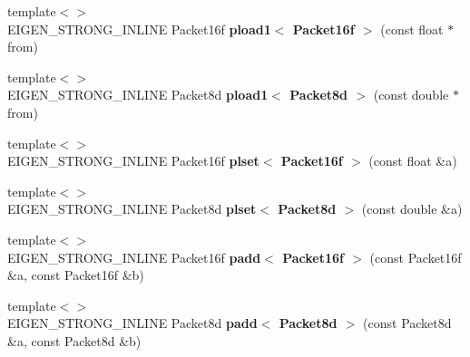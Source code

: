 \begin{DoxyCompactItemize}
\item 
\mbox{\label{namespace_eigen_1_1internal_a93170893c443fea5002051e343f9ffa9}} 
{\footnotesize template$<$$>$ }\\E\+I\+G\+E\+N\+\_\+\+S\+T\+R\+O\+N\+G\+\_\+\+I\+N\+L\+I\+NE Packet16f {\bfseries pload1$<$ Packet16f $>$} (const float $\ast$from)
\item 
\mbox{\label{namespace_eigen_1_1internal_a6dc41c241621125059e06cbb17b2b5b0}} 
{\footnotesize template$<$$>$ }\\E\+I\+G\+E\+N\+\_\+\+S\+T\+R\+O\+N\+G\+\_\+\+I\+N\+L\+I\+NE Packet8d {\bfseries pload1$<$ Packet8d $>$} (const double $\ast$from)
\item 
\mbox{\label{namespace_eigen_1_1internal_a584837fcbeb0a3a2f270d0e5641dd549}} 
{\footnotesize template$<$$>$ }\\E\+I\+G\+E\+N\+\_\+\+S\+T\+R\+O\+N\+G\+\_\+\+I\+N\+L\+I\+NE Packet16f {\bfseries plset$<$ Packet16f $>$} (const float \&a)
\item 
\mbox{\label{namespace_eigen_1_1internal_a0f38ae595019ff37781e26e8e5ab2a7f}} 
{\footnotesize template$<$$>$ }\\E\+I\+G\+E\+N\+\_\+\+S\+T\+R\+O\+N\+G\+\_\+\+I\+N\+L\+I\+NE Packet8d {\bfseries plset$<$ Packet8d $>$} (const double \&a)
\item 
\mbox{\label{namespace_eigen_1_1internal_a18bf28fc3b5a83afdc62ec3dd840d2c1}} 
{\footnotesize template$<$$>$ }\\E\+I\+G\+E\+N\+\_\+\+S\+T\+R\+O\+N\+G\+\_\+\+I\+N\+L\+I\+NE Packet16f {\bfseries padd$<$ Packet16f $>$} (const Packet16f \&a, const Packet16f \&b)
\item 
\mbox{\label{namespace_eigen_1_1internal_afe98586b5559ae0be8117f91527fb922}} 
{\footnotesize template$<$$>$ }\\E\+I\+G\+E\+N\+\_\+\+S\+T\+R\+O\+N\+G\+\_\+\+I\+N\+L\+I\+NE Packet8d {\bfseries padd$<$ Packet8d $>$} (const Packet8d \&a, const Packet8d \&b)
\item 
\mbox{\label{namespace_eigen_1_1internal_a4a54dba1b00dea6e9dd92c1cccbb1101}} 

\end{DoxyCompactItemize}
